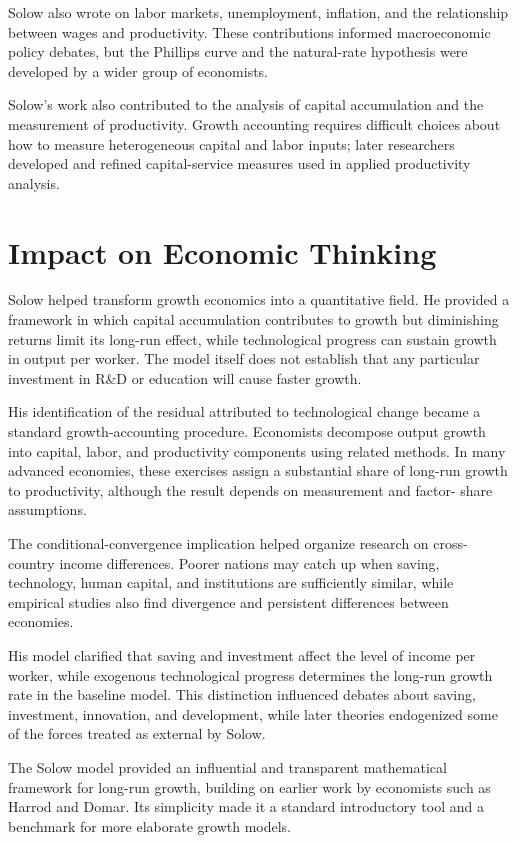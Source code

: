 Solow also wrote on labor markets, unemployment, inflation, and the
relationship between wages and productivity. These contributions informed
macroeconomic policy debates, but the Phillips curve and the natural-rate
hypothesis were developed by a wider group of economists.

Solow's work also contributed to the analysis of capital accumulation and the
measurement of productivity. Growth accounting requires difficult choices about
how to measure heterogeneous capital and labor inputs; later researchers
developed and refined capital-service measures used in applied productivity
analysis.

\section{Impact on Economic Thinking}
Solow helped transform growth economics into a quantitative field. He provided
a framework in which capital accumulation contributes to growth but diminishing
returns limit its long-run effect, while technological progress can sustain
growth in output per worker. The model itself does not establish that any
particular investment in R\&D or education will cause faster growth.

His identification of the residual attributed to technological change became a
standard growth-accounting procedure. Economists decompose output growth into
capital, labor, and productivity components using related methods. In many
advanced economies, these exercises assign a substantial share of long-run
growth to productivity, although the result depends on measurement and factor-
share assumptions.

The conditional-convergence implication helped organize research on
cross-country income differences. Poorer nations may catch up when saving,
technology, human capital, and institutions are sufficiently similar, while
empirical studies also find divergence and persistent differences between
economies.

His model clarified that saving and investment affect the level of income per
worker, while exogenous technological progress determines the long-run growth
rate in the baseline model. This distinction influenced debates about saving,
investment, innovation, and development, while later theories endogenized
some of the forces treated as external by Solow.

The Solow model provided an influential and transparent mathematical framework
for long-run growth, building on earlier work by economists such as Harrod and
Domar. Its simplicity made it a standard introductory tool and a benchmark for
more elaborate growth models.

